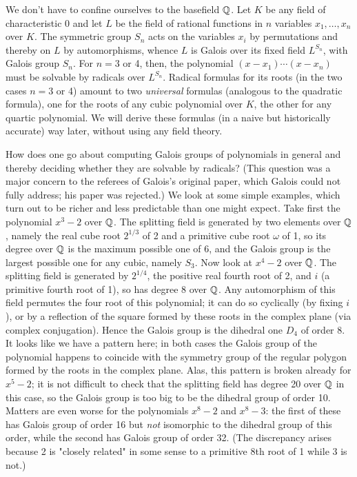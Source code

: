 We don't have to confine ourselves to the basefield $\Bbb Q$.  Let $K$ be any field of characteristic 0 and let $L$ be the field of rational functions in $n$ variables $x_1,\ldots,x_n$ over $K$.  The symmetric group $S_n$ acts on the variables $x_i$ by permutations and thereby on $L$ by automorphisms, whence $L$ is Galois over its fixed field $L^{S_n}$, with Galois group $S_n$.  For $n=3$ or 4, then, the polynomial $(x-x_1)\cdots(x-x_n)$ must be solvable by radicals over $L^{S_n}$.  Radical formulas for its roots (in the two cases $n=3$ or 4) amount to two {\sl universal} formulas (analogous to the quadratic formula), one for the roots of any cubic polynomial over $K$, the other for any quartic polynomial.  We will derive these formulas (in a naive but historically accurate) way later, without using any field theory.

How does one go about computing Galois groups of polynomials in general and thereby deciding whether they are solvable by radicals? (This question was a major concern to the referees of Galois's original paper, which Galois could not fully address; his paper was rejected.)  We look at some simple examples, which turn out to be richer and less predictable than one might expect.  Take first the polynomial $x^3 - 2$ over $\Bbb Q$.  The splitting field is generated by two elements over $\Bbb Q$, namely the real cube root $2^{1/3}$ of 2 and a primitive cube root $\omega$ of 1, so its degree over
$\Bbb Q$ is the maximum possible one of 6, and the Galois group is the largest possible one for any cubic, namely $S_3$.  Now look at $x^4 - 2$ over $\Bbb Q$.  The splitting field is generated by $2^{1/4}$, the positive real fourth root of 2, and $i$ (a primitive fourth root of 1), so has degree 8 over $\Bbb Q$.  Any automorphism of this field permutes the four root of this polynomial; it can do so cyclically (by fixing $i$), or by a reflection of the square formed by these roots in the complex plane (via complex conjugation).  Hence the Galois group is the dihedral one $D_4$ of order 8.  It looks like we have a pattern here; in both cases the Galois group of the polynomial happens to coincide with the symmetry group of the regular polygon formed by the roots in the complex plane.  Alas, this pattern is broken already for $x^5 - 2$; it is not difficult to check that the splitting field has degree 20 over
$\Bbb Q$ in this case, so the Galois group is too big to be the dihedral group of order 10.  Matters are even worse for the polynomials $x^8 - 2$ and $x^8 - 3$:  the first of these has Galois group of order 16 but {\sl not} isomorphic to the dihedral group of this order, while the second has Galois group of order 32.  (The discrepancy arises because 2 is "closely related" in some sense to a primitive 8th root of 1 while 3 is not.)  